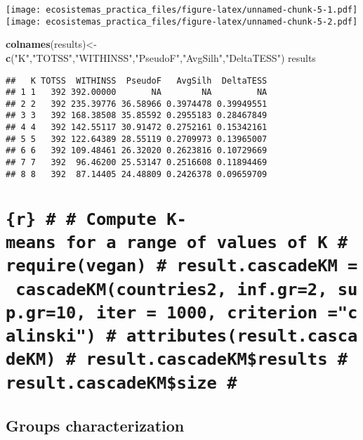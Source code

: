 \documentclass[]{article}
\newenvironment{Shaded}{\begin{snugshade}}{\end{snugshade}}
\newcommand{\KeywordTok}[1]{\textcolor[rgb]{0.13,0.29,0.53}{\textbf{#1}}}
\newcommand{\StringTok}[1]{\textcolor[rgb]{0.31,0.60,0.02}{#1}}
\newcommand{\NormalTok}[1]{#1}
\begin{document}
\texttt{[image: ecosistemas\_practica\_files/figure-latex/unnamed-chunk-5-1.pdf]}
\texttt{[image: ecosistemas\_practica\_files/figure-latex/unnamed-chunk-5-2.pdf]}

\begin{Shaded}
\begin{Highlighting}[]
\KeywordTok{colnames}\NormalTok{(results)<-}\KeywordTok{c}\NormalTok{(}\StringTok{"K"}\NormalTok{,}\StringTok{"TOTSS"}\NormalTok{,}\StringTok{"WITHINSS"}\NormalTok{,}\StringTok{"PseudoF"}\NormalTok{,}\StringTok{"AvgSilh"}\NormalTok{,}\StringTok{"DeltaTESS"}\NormalTok{)}
\NormalTok{results}
\end{Highlighting}
\end{Shaded}

\begin{verbatim}
##   K TOTSS  WITHINSS  PseudoF   AvgSilh  DeltaTESS
## 1 1   392 392.00000       NA        NA         NA
## 2 2   392 235.39776 36.58966 0.3974478 0.39949551
## 3 3   392 168.38508 35.85592 0.2955183 0.28467849
## 4 4   392 142.55117 30.91472 0.2752161 0.15342161
## 5 5   392 122.64389 28.55119 0.2709973 0.13965007
## 6 6   392 109.48461 26.32020 0.2623816 0.10729669
## 7 7   392  96.46200 25.53147 0.2516608 0.11894469
## 8 8   392  87.14405 24.48809 0.2426378 0.09659709
\end{verbatim}

\section{\texorpdfstring{\texttt{\{r\}\ \#\ \#\ Compute\ K-means\ for\ a\ range\ of\ values\ of\ K\ \#\ require(vegan)\ \#\ result.cascadeKM\ =\ cascadeKM(countries2,\ inf.gr=2,\ sup.gr=10,\ iter\ =\ 1000,\ criterion\ ="calinski")\ \#\ attributes(result.cascadeKM)\ \#\ result.cascadeKM\$results\ \#\ result.cascadeKM\$size\ \#}}{\{r\} \# \# Compute K-means for a range of values of K \# require(vegan) \# result.cascadeKM = cascadeKM(countries2, inf.gr=2, sup.gr=10, iter = 1000, criterion ="calinski") \# attributes(result.cascadeKM) \# result.cascadeKM\$results \# result.cascadeKM\$size \#}}\label{r-compute-k-means-for-a-range-of-values-of-k-requirevegan-result.cascadekm-cascadekmcountries2-inf.gr2-sup.gr10-iter-1000-criterion-calinski-attributesresult.cascadekm-result.cascadekmresults-result.cascadekmsize}

\subsection{Groups characterization}\label{groups-characterization}
\end{document}
